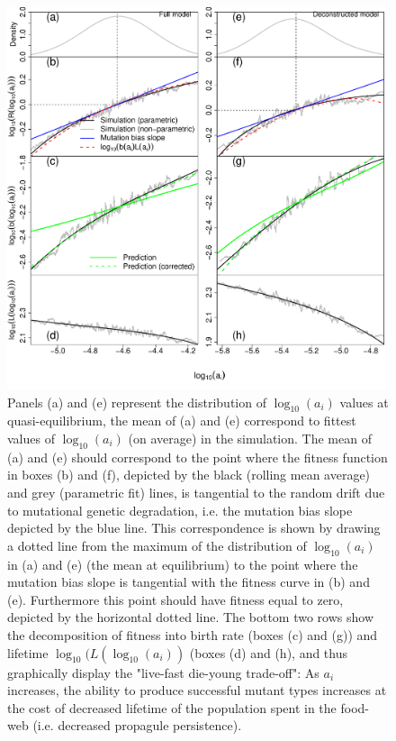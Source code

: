 \documentclass[a4paper]{report}
\DeclareMathOperator{\log}{log}
\begin{document}
\begin{figure}[H]
  
\begin{center}
  \includegraphics[scale=0.6]{../Images/All_deconstructed.pdf}
\end{center}
\caption{Panels (a) and (e) represent the distribution of $\log_{10}(a_i)$ values at quasi-equilibrium, the mean of (a) and (e) correspond to fittest values of $\log_{10}(a_i)$ (on average) in the simulation. The mean of (a) and (e) should correspond to the point where the fitness function in boxes (b) and (f), depicted by the black (rolling mean average) and grey (parametric fit) lines, is tangential to the random drift due to mutational genetic degradation, i.e. the mutation bias slope depicted by the blue line. This correspondence is shown by drawing a dotted line from the maximum of the distribution of $\log_{10}(a_i)$ in (a) and (e) (the mean at equilibrium) to the point where the mutation bias slope is tangential with the fitness curve in (b) and (e). Furthermore this point should have fitness equal to zero, depicted by the horizontal dotted line. The bottom two rows show the decomposition of fitness into birth rate (boxes (c) and (g)) and lifetime $\log_{10}(L(\log_{10}(a_i))$  (boxes (d) and (h), and thus graphically display the "live-fast die-young trade-off": As $a_i$ increases, the ability to produce successful mutant types increases at the cost of decreased lifetime of the population spent in the food-web (i.e. decreased propagule persistence).   \label{fig:fitness-decomposition}
  }
\end{figure}\\
\end{document}
